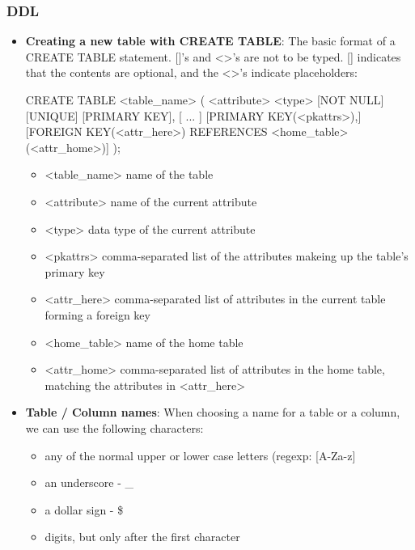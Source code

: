 \documentclass{report}
\begin{document}
        \subsubsection{DDL}
        \begin{itemize}
        \item \textbf{Creating a new table with CREATE TABLE}: The basic format of a CREATE TABLE statement. []'s and <>'s are not to be typed. [] indicates that the contents are optional, and the <>'s indicate placeholders:
            \bigbreak \noindent 
            \begin{sqlcode}
                CREATE TABLE <table_name> (
                    <attribute> <type> [NOT NULL] [UNIQUE] [PRIMARY KEY], [ ... ]
                    [PRIMARY KEY(<pkattrs>),]
                    [FOREIGN KEY(<attr_here>) REFERENCES <home_table>(<attr_home>)]
                );
            \end{sqlcode}
            \begin{itemize}
                \item <table\_name> name of the table
                \item <attribute> name of the current attribute
                \item <type> data type of the current attribute
                \item <pkattrs> comma-separated list of the attributes makeing up the table's primary key
                \item <attr\_here> comma-separated list of attributes in the current table forming a foreign key
                \item <home\_table> name of the home table
                \item <attr\_home> comma-separated list of attributes in the home table, matching the attributes in <attr\_here>
            \end{itemize}
        \item \textbf{Table / Column names}: When choosing a name for a table or a column, we can use the following characters:
            \begin{itemize}
                \item any of the normal upper or lower case letters (regexp: [A-Za-z]
                \item an underscore - \_
                \item a dollar sign - \$
                \item digits, but only after the first character
            \end{itemize}

\end{itemize}
\end{document}
